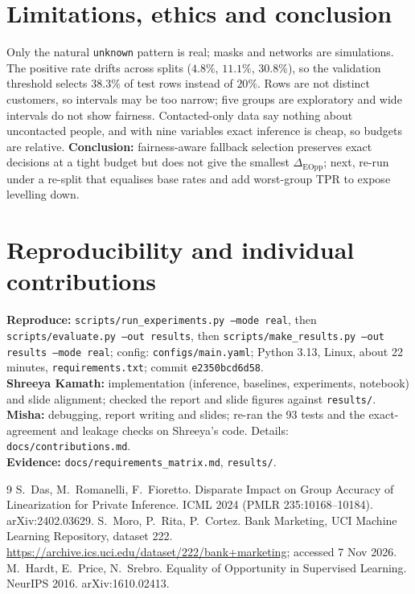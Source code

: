 \documentclass[11pt,a4paper]{article}
\begin{document}
\section{Limitations, ethics and conclusion}
Only the natural \texttt{unknown} pattern is real; masks and networks are simulations. The positive rate drifts across splits ($4.8\%$, $11.1\%$, $30.8\%$), so the validation threshold selects $38.3\%$ of test rows instead of $20\%$. Rows are not distinct customers, so intervals may be too narrow; five groups are exploratory and wide intervals do not show fairness. Contacted-only data say nothing about uncontacted people, and with nine variables exact inference is cheap, so budgets are relative. \textbf{Conclusion:} fairness-aware fallback selection preserves exact decisions at a tight budget but does not give the smallest $\Delta_{\mathrm{EOpp}}$; next, re-run under a re-split that equalises base rates and add worst-group TPR to expose levelling down.

\section*{Reproducibility and individual contributions}
\textbf{Reproduce:} \texttt{scripts/run\_experiments.py --mode real}, then \texttt{scripts/evaluate.py --out results}, then \texttt{scripts/make\_results.py --out results --mode real}; config: \texttt{configs/main.yaml}; Python 3.13, Linux, about 22 minutes, \texttt{requirements.txt}; commit \texttt{e2350bcd6d58}.\\
\textbf{Shreeya Kamath:} implementation (inference, baselines, experiments, notebook) and slide alignment; checked the report and slide figures against \texttt{results/}. \textbf{Misha:} debugging, report writing and slides; re-ran the 93 tests and the exact-agreement and leakage checks on Shreeya's code. Details: \texttt{docs/contributions.md}.\\
\textbf{Evidence:} \texttt{docs/requirements\_matrix.md}, \texttt{results/}.
\begin{thebibliography}{9}\small
{} S.\ Das, M.\ Romanelli, F.\ Fioretto. Disparate Impact on Group Accuracy of Linearization for Private Inference. ICML 2024 (PMLR 235:10168--10184). arXiv:2402.03629.
 S.\ Moro, P.\ Rita, P.\ Cortez. Bank Marketing, UCI Machine Learning Repository, dataset 222. \url{https://archive.ics.uci.edu/dataset/222/bank+marketing}; accessed 7 Nov 2026.
 M.\ Hardt, E.\ Price, N.\ Srebro. Equality of Opportunity in Supervised Learning. NeurIPS 2016. arXiv:1610.02413.
\end{thebibliography}
\end{document}
